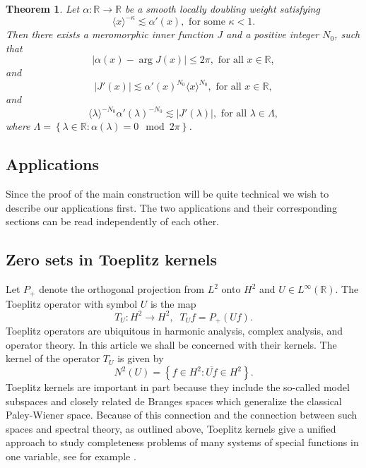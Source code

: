 \documentclass{article}[12pt]
\newtheorem{theorem}{Theorem}
\theoremstyle{remark}
\begin{document}
    \begin{theorem}\label{thm:main}
        Let $\alpha : \mathbb{R} \to \mathbb{R}$ be a smooth locally doubling weight satisfying
        \begin{equation*}
                \langle x \rangle^{-\kappa} \lesssim \alpha'(x), \text{ for some } \kappa < 1.
        \end{equation*}
        Then there exists a meromorphic inner function $J$ and a positive integer $N_{0}$, such that
        \begin{equation*}
            \lvert \alpha(x) -\arg J(x) \rvert \leq 2\pi, \text{ for all } x \in \mathbb{R},
        \end{equation*}
        and
        \begin{equation*}
            \lvert J'(x) \rvert \lesssim \alpha'(x)^{N_{0}}\langle x \rangle^{N_{0}}, \text{ for all }x \in \mathbb{R},
        \end{equation*}
        and
        \begin{equation*}
            \langle \lambda \rangle^{-N_{0}}\alpha'(\lambda)^{-N_{0}} \lesssim \lvert J'(\lambda) \rvert, \text{ for all } \lambda \in \Lambda,
        \end{equation*}
        where $\Lambda = \left\{ \lambda \in \mathbb{R} : \alpha(\lambda) = 0 \mod 2\pi\right\}$.
    \end{theorem}

\subsection{Applications}

Since the proof of the main construction will be quite technical we wish to describe our applications first. The two applications and their corresponding sections can be read independently of each other.

\subsection*{Zero sets in Toeplitz kernels}

Let $P_{+}$ denote the orthogonal projection from $L^{2}$ onto $H^{2}$ and $U \in L^{\infty}(\mathbb{R})$. The Toeplitz operator with symbol $U$ is the map
\begin{equation*}
    T_{U} : H^{2} \to H^{2}, \; \; T_{U}f = P_{+}(Uf).
\end{equation*}
Toeplitz operators are ubiquitous in harmonic analysis, complex analysis, and operator theory. In this article we shall be concerned with their kernels. The kernel of the operator $T_{U}$ is given by
\begin{equation*}
    N^{2}(U) = \left\{ f \in H^{2}: \overline{Uf} \in H^{2}\right\}.   
\end{equation*}
Toeplitz kernels are important in part because they include the so-called model subspaces and closely related de Branges spaces which generalize the classical Paley-Wiener space. Because of this connection and the connection between such spaces and spectral theory, as outlined above, Toeplitz kernels give a unified approach to study completeness problems of many systems of special functions in one variable, see for example \cite{MR643384, MR2215727}.
\end{document}
